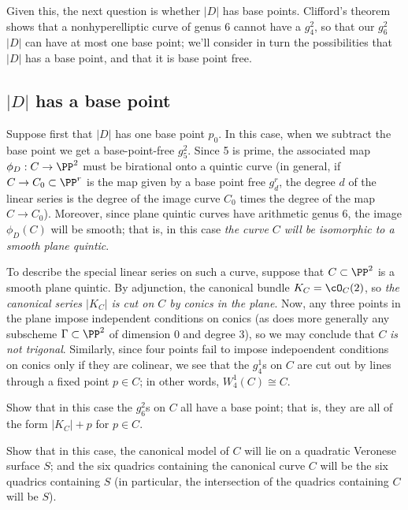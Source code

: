 Given this, the next question is whether $|D|$ has base points.  Clifford's theorem shows that a nonhyperelliptic curve of genus 6 cannot have a $g^2_4$, so that our $g^2_6$ $|D|$ can have at most one base point; we'll consider in turn the possibilities that $|D|$ has a base point, and that it is base point free.

\subsection{$|D|$ has a base point}

Suppose first that $|D|$ has one base point $p_0$. In this case, when we subtract the base point we get a base-point-free $g^2_5$. Since 5 is prime, the associated map $\phi_D : C \to \PP^2$ must be birational onto a quintic curve (in general, if $C \to C_0 \subset \PP^r$ is the map given by a base point free $g^r_d$, the degree $d$ of the linear series is the degree of the image curve $C_0$ times the degree of the map $C \to C_0$). Moreover, since plane quintic curves have arithmetic genus 6, the image $\phi_D(C)$ will be smooth; that is, in this case \emph{the curve $C$ will be isomorphic to a smooth plane quintic}.

To describe the special linear series on such a curve, suppose that $C \subset \PP^2$ is a smooth plane quintic. By adjunction, the canonical bundle $K_C = \cO_C(2)$, so \emph{the canonical series $|K_C|$ is cut on $C$ by conics in the plane}. Now, any three points in the plane impose independent conditions on conics (as does more generally any subscheme $\Gamma \subset \PP^2$ of dimension 0 and degree 3), so we may conclude that $C$ \emph{is not trigonal}. Similarly, since four points fail to impose indepoendent conditions on conics only if they are colinear, we see that the $g^1_4$s on $C$ are cut out by lines through a fixed point $p \in C$; in other words, $W^1_4(C) \cong C$.

\begin{exercise}
Show that in this case the $g^2_6$s on $C$ all have a base point; that is, they are all of the form $|K_C| + p$ for $p \in C$.
\end{exercise} 


\begin{exercise}
Show that in this case, the canonical model of $C$ will lie on a quadratic Veronese surface $S$; and the six
quadrics containing the canonical curve $C$ will be the six quadrics containing $S$ (in particular, the intersection of the quadrics containing $C$ will be $S$).
\end{exercise} 


